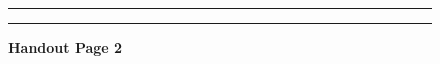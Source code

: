 \documentclass[]{article}
\begin{document}
\newpage

\begin{figure}[!ht]
    \hrule
    \caption{ \textbf{Handout Page 2} }
    \begin{center}
    \end{center}
    \label{fig:handout-2}
    \hrule
\end{figure}

\newpage
\end{document}
